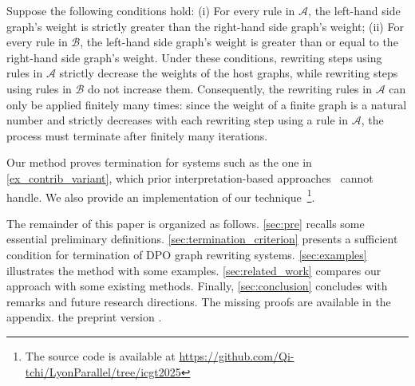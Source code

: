 Suppose the following conditions hold: (i) For every rule in \( \mathcal{A} \), the left-hand side graph's weight is strictly greater than the right-hand side graph's weight; (ii) For every rule in \( \mathcal{B} \), the left-hand side graph's weight is greater than or equal to the right-hand side graph's weight. 
Under these conditions, rewriting steps using rules in \( \mathcal{A} \) strictly decrease the weights of the host graphs, while rewriting steps using rules in \( \mathcal{B} \) do not increase them.
Consequently, the rewriting rules in \( \mathcal{A} \) can only be applied finitely many times: since the weight of a finite graph is a natural number and strictly decreases with each rewriting step using a rule in \( \mathcal{A} \), the process must terminate after finitely many iterations.  

Our method proves termination for systems such as the one in \autoref{ex_contrib_variant}, which prior interpretation-based approaches~\cite{zantema2014termination,bruggink2014termination,bruggink2015proving,
endrullis2024generalized_arxiv_v2,
overbeek2024termination_lmcs} cannot handle. 
We also provide an implementation of our technique~\footnote{The source code is available at \url{https://github.com/Qi-tchi/LyonParallel/tree/icgt2025}}.  
   
The remainder of this paper is organized as follows.
\autoref{sec:pre} recalls some essential preliminary definitions. 
\autoref{sec:termination_criterion} presents a sufficient condition for termination of DPO graph rewriting systems.
\autoref{sec:examples} illustrates the method with some examples.
\autoref{sec:related_work} compares our approach with some existing methods.
Finally, \autoref{sec:conclusion} concludes with remarks and future research directions. The missing proofs are available in 
\iflongversion
the appendix.
\else
the preprint version \cite{qiu2025termination}.
\fi
